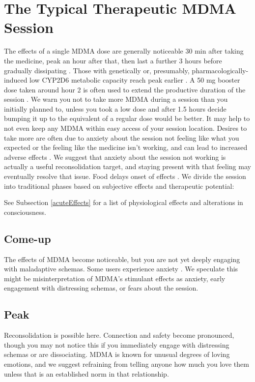 \documentclass[12pt,letterpaper]{book}
\begin{document}
\section{The Typical Therapeutic MDMA Session}
\label{session}
The effects of a single MDMA dose are generally noticeable 30 min after taking the medicine, peak an hour after that, then last a further 3 hours before gradually dissipating \cite{vizeliActuteEffects}. Those with genetically or, presumably, pharmacologically-induced low CYP2D6 metabolic capacity reach peak earlier \cite{schmid2016cyp2d6}. A 50 mg booster dose taken around hour 2 is often used to extend the productive duration of the session \cite{liechtiInteractions}. We warn you not to take more MDMA during a session than you initially planned to, unless you took a low dose and after 1.5 hours decide bumping it up to the equivalent of a regular dose would be better. It may help to not even keep any MDMA within easy access of your session location. Desires to take more are often due to anxiety about the session not feeling like what you expected or the feeling like the medicine isn't working, and can lead to increased adverse effects \cite{bruntLinking}. We suggest that anxiety about the session not working is actually a useful reconsolidation target, and staying present with that feeling may eventually resolve that issue. Food delays onset of effects \cite{MithoeferMDMA}. We divide the session into traditional phases based on subjective effects and therapeutic potential:

See Subsection \ref{acuteEffects} for a list of physiological effects and alterations in consciousness.

\subsection*{Come-up}
The effects of MDMA become noticeable, but you are not yet deeply engaging with maladaptive schemas. Some users experience anxiety \cite{hillsSolo}. We speculate this might be misinterpretation of MDMA's stimulant effects as anxiety, early engagement with distressing schemas, or fears about the session.

\subsection*{Peak}
Reconsolidation is possible here. Connection and safety become pronounced, though you may not notice this if you immediately engage with distressing schemas or are dissociating. MDMA is known for unusual degrees of loving emotions, and we suggest refraining from telling anyone how much you love them unless that is an established norm in that relationship.
\end{document}
